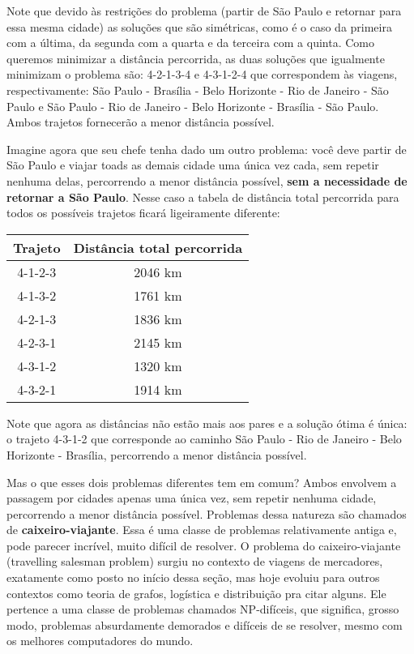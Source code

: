 \documentclass[11pt]{article}
\begin{document}
Note que devido às restrições do problema (partir de São Paulo e
retornar para essa mesma cidade) as soluções que são simétricas, como é
o caso da primeira com a última, da segunda com a quarta e da terceira
com a quinta. Como queremos minimizar a distância percorrida, as duas
soluções que igualmente minimizam o problema são: 4-2-1-3-4 e 4-3-1-2-4
que correspondem às viagens, respectivamente: São Paulo - Brasília -
Belo Horizonte - Rio de Janeiro - São Paulo e São Paulo - Rio de Janeiro
- Belo Horizonte - Brasília - São Paulo. Ambos trajetos fornecerão a
menor distância possível.

Imagine agora que seu chefe tenha dado um outro problema: você deve
partir de São Paulo e viajar toads as demais cidade uma única vez cada,
sem repetir nenhuma delas, percorrendo a menor distância possível,
\textbf{sem a necessidade de retornar a São Paulo}. Nesse caso a tabela
de distância total percorrida para todos os possíveis trajetos ficará
ligeiramente diferente:

\begin{longtable}[]{@{}cc@{}}
\toprule
Trajeto & Distância total percorrida \\
\midrule
\endhead
4-1-2-3 & 2046 km \\
4-1-3-2 & 1761 km \\
4-2-1-3 & 1836 km \\
4-2-3-1 & 2145 km \\
4-3-1-2 & 1320 km \\
4-3-2-1 & 1914 km \\
\bottomrule
\end{longtable}

Note que agora as distâncias não estão mais aos pares e a solução ótima
é única: o trajeto 4-3-1-2 que corresponde ao caminho São Paulo - Rio de
Janeiro - Belo Horizonte - Brasília, percorrendo a menor distância
possível.

Mas o que esses dois problemas diferentes tem em comum? Ambos envolvem a
passagem por cidades apenas uma única vez, sem repetir nenhuma cidade,
percorrendo a menor distância possível. Problemas dessa natureza são
chamados de \textbf{caixeiro-viajante}. Essa é uma classe de problemas
relativamente antiga e, pode parecer incrível, muito difícil de
resolver. O problema do caixeiro-viajante (travelling salesman problem)
surgiu no contexto de viagens de mercadores, exatamente como posto no
início dessa seção, mas hoje evoluiu para outros contextos como teoria
de grafos, logística e distribuição pra citar alguns. Ele pertence a uma
classe de problemas chamados NP-difíceis, que significa, grosso modo,
problemas absurdamente demorados e difíceis de se resolver, mesmo com os
melhores computadores do mundo.
\end{document}
